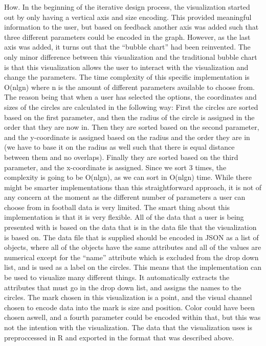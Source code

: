 \documentclass[Report.tex]{subfiles}
\begin{document}
\noindent How. In the beginning of the iterative design process, the visualization started out by only having a vertical axis and size encoding. This provided meaningful information to the user, but based on feedback another axis was added such that three different parameters could be encoded in the graph. However, as the last axis was added, it turns out that the ``bubble chart'' had been reinvented. The only minor difference between this visualization and the traditional bubble chart is that this visualization allows the user to interact with the visualization and change the parameters. The time complexity of this specific implementation is O(nlgn) where n is the amount of different parameters available to choose from. The reason being that when a user has selected the options, the coordinates and sizes of the circles are calculated in the following way: First the circles are sorted based on the first parameter, and then the radius of the circle is assigned in the order that they are now in. Then they are sorted based on the second parameter, and the y-coordinate is assigned based on the radius and the order they are in (we have to base it on the radius as well such that there is equal distance between them and no overlaps). Finally they are sorted based on the third parameter, and the x-coordinate is assigned. Since we sort 3 times, the complexity is going to be O(nlgn), as we can sort in O(nlgn) time. While there might be smarter implementations than this straightforward approach, it is not of any concern at the moment as the different number of parameters a user can choose from in football data is very limited. The smart thing about this implementation is that it is very flexible. All of the data that a user is being presented with is based on the data that is in the data file that the visualization is based on. The data file that is supplied should be encoded in JSON as a list of objects, where all of the objects have the same attributes and all of the values are numerical except for the ``name'' attribute which is excluded from the drop down list, and is used as a label on the circles. This means that the implementation can be used to visualize many different things. It automatically extracts the attributes that must go in the drop down list, and assigns the names to the circles. The mark chosen in this visualization is a point, and the visual channel chosen to encode data into the mark is size and position. Color could have been chosen aswell, and a fourth parameter could be encoded within that, but this was not the intention with the visualization. The data that the visualization uses is preproccessed in R and exported in the format that was described above.
\end{document}
